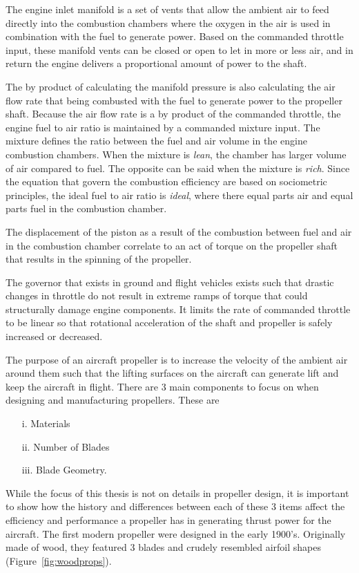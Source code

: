 \documentclass[12pt]{report}
\begin{document}
The engine inlet manifold is a set of vents that allow the ambient air to feed directly into the combustion chambers where the oxygen in the air is used in combination with the fuel to generate power. Based on the commanded throttle input, these manifold vents can be closed or open to let in more or less air, and in return the engine delivers a proportional amount of power to the shaft.

The by product of calculating the manifold pressure is also calculating the air flow rate that being combusted with the fuel to generate power to the propeller shaft. Because the air flow rate is a by product of the commanded throttle, the engine fuel to air ratio is maintained by a commanded mixture input. The mixture defines the ratio between the fuel and air volume in the engine combustion chambers. When the mixture is \textit{lean}, the chamber has larger volume of air compared to fuel. The opposite can be said when the mixture is \textit{rich}. Since the equation that govern the combustion efficiency are based on sociometric principles, the ideal fuel to air ratio is \textit{ideal}, where there equal parts air and equal parts fuel in the combustion chamber.

The displacement of the piston as a result of the combustion between fuel and air in the combustion chamber correlate to an act of torque on the propeller shaft that results in the spinning of the propeller.

The governor that exists in ground and flight vehicles exists such that drastic changes in throttle do not result in extreme ramps of torque that could structurally damage engine components. It limits the rate of commanded throttle to be linear so that rotational acceleration of the shaft and propeller is safely increased or decreased.

The purpose of an aircraft propeller is to increase the velocity of the ambient air around them such that the lifting surfaces on the aircraft can generate lift and keep the aircraft in flight. There are 3 main components to focus on when designing and manufacturing propellers. These are
\begin{itemize}
  \item[i.] Materials
  \item[ii.] Number of Blades
  \item[iii.] Blade Geometry.
\end{itemize}
While the focus of this thesis is not on details in propeller design, it is important to show how the history and differences between each of these 3 items affect the efficiency and performance a propeller has in generating thrust power for the aircraft. The first modern propeller were designed in the early 1900's. Originally made of wood, they featured 3 blades and crudely resembled airfoil shapes (Figure~\ref{fig:woodprops}).
\end{document}
